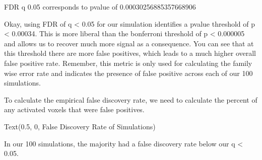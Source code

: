 \documentclass[letterpaper,10pt,english]{sphinxmanual}
\begin{document}
\begin{sphinxVerbatim}[commandchars=\\\{\}]
FDR q \PYGZlt{} 0.05 corresponds to p\PYGZhy{}value of 0.00030256885357668906
\end{sphinxVerbatim}

\noindent{}

Okay, using FDR of q \textless{} 0.05 for our simulation identifies a p\sphinxhyphen{}value threshold of p \textless{} 0.00034. This is more liberal than the bonferroni threshold of p \textless{} 0.000005 and allows us to recover much more signal as a consequence. You can see that at this threshold there are more false positives, which leads to a much higher overall false positive rate. Remember, this metric is only used for calculating the family wise error rate and indicates the presence of  false positive across each of our 100 simulations.

To calculate the empirical false discovery rate, we need to calculate the percent of any activated voxels that were false positives.

\begin{sphinxVerbatim}[commandchars=\\\{\}]
 
 
 
\end{sphinxVerbatim}

\begin{sphinxVerbatim}[commandchars=\\\{\}]
Text(0.5, 0, \PYGZsq{}False Discovery Rate of Simulations\PYGZsq{})
\end{sphinxVerbatim}

\noindent{}

In our 100 simulations, the majority had a false discovery rate below our q \textless{} 0.05.
\end{document}

